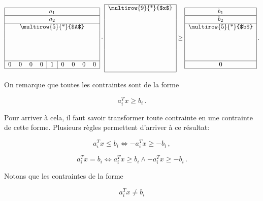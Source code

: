 	\[
	\begin{tabular}{|ccccccccc|}
		\hline
		\multicolumn{9}{|c|}{$a_1$} \\
		\hline
		\multicolumn{9}{|c|}{$a_2$} \\
		\hline
		\multicolumn{9}{|c|}{\multirow{5}{*}{$A$}}
		\\
		&&&&&&&&\\
		&&&&&&&&\\
		&&&&&&&&\\
		&&&&&&&&\\
		\hline
		0 & 0 & 0 & 0 & \multicolumn{1}{|c|}{1} & 0 & 0 & 0 & 0 \\
		\hline
	\end{tabular}
	\cdot
	\begin{tabular}{|c|}
		\hline
		\multirow{9}{*}{$x$}
		\\
		\\
		\\
		\\
		\\
		\\
		\\
		\\
		\\
		\hline
	\end{tabular}
	\ge
	\begin{tabular}{|c|}
		\hline
		$b_1$ \\
		\hline
		$b_2$ \\
		\hline
		\multirow{5}{*}{$b$}
		\\
		\\
		\\
		\\
		\\
		\hline
		0 \\
		\hline
	\end{tabular}\,.
	\]

	On remarque que toutes les contraintes sont de la forme

	\[
	a_i^T x \ge b_i\,.
	\]

	Pour arriver à cela,
	il faut savoir transformer toute contrainte
	en une contrainte de cette forme.
	Plusieurs règles permettent d'arriver à ce résultat:

	\[
	a_i^T x \le b_i \iff -a_i^T x \ge -b_i\,,
	\]

	\[
	a_i^T x = b_i \iff a_i^T x \ge b_i \land -a_i^T x \ge -b_i\,.
	\]

	Notons que les contraintes de la forme

	\[
	a_i^T x \ne b_i
	\]

